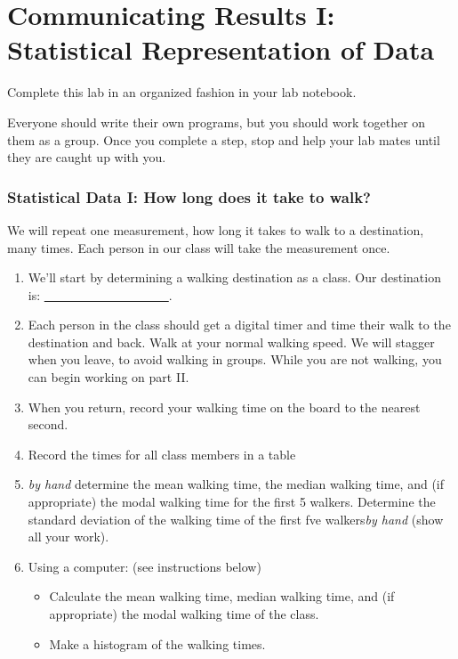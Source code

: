 \documentclass[twoside,11pt,ShortChapTitles]{BYUTextbook}
\begin{document}
\chapter[Statistical Representation of Data]{Communicating Results I: Statistical Representation of Data}

Complete this lab in an organized fashion in your lab notebook.

Everyone should write their own programs, but you should work together on them as a group.  Once you complete a step, stop and help your lab mates until they are caught up with you.

\subsection{Statistical Data I: How long does it take to walk?}

We will repeat one measurement, how long it takes to walk to a destination,
many times. Each person in our class will take the measurement once.

\begin{enumerate}
\item We'll start by determining a walking destination as a class. Our
destination is: \underline{\ \ \ \ \ \ \ \ \ \ \ \ \ \ \ \ \ \ \ \ }.

\item Each person in the class should get a digital timer and time their
walk to the destination and back. Walk at your normal walking speed. We will
stagger when you leave, to avoid walking in groups. While you are not
walking, you can begin working on part II.

\item When you return, record your walking time on the board to the nearest
second.

\item Record the times for all class members in a table
\item  \emph{by hand}
determine the mean walking time, the median walking time, and (if
appropriate) the modal walking time for the first 5 walkers. Determine the standard deviation of the
walking time of the first fve walkers\emph{by hand} (show all your work).

\item Using a computer: (see instructions below)
\begin{itemize}
\item Calculate the mean walking time, median walking time, and (if appropriate) the modal walking time of the class.
\item Make a histogram of the walking times.
\end{itemize}
\end{enumerate}
\end{document}
